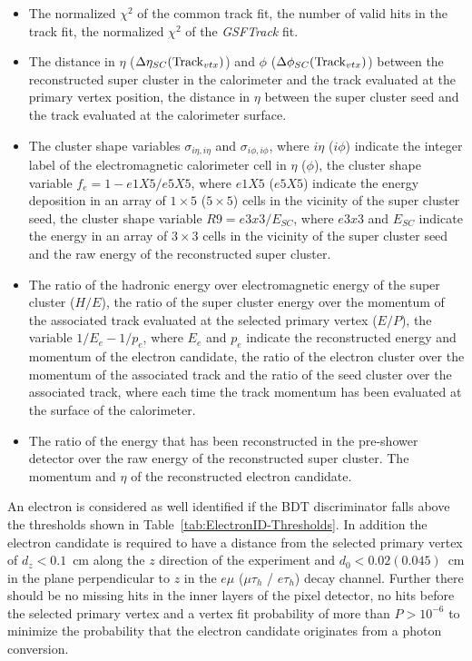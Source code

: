 \begin{itemize}
\item
The normalized $\chi^{2}$ of the common track fit, the number of valid hits in the track fit, the normalized
$\chi^{2}$ of the {\it GSFTrack} fit.
\item
The distance in $\eta$ ($\Delta\eta_{SC}({\rm Track}_{vtx})$) and $\phi$ ($\Delta\phi_{SC}({\rm Track}_{vtx})$)
between the reconstructed super cluster in the calorimeter and the track evaluated at the primary vertex
position, the distance in $\eta$ between the super cluster seed and the track evaluated at the calorimeter
surface.
\item
The cluster shape variables $\sigma_{i\eta,i\eta}$ and $\sigma_{i\phi, i\phi}$, where $i\eta$ ($i\phi$)
indicate the integer label of the electromagnetic calorimeter cell in $\eta$ ($\phi$), the cluster shape
variable $f_{e}=1-e1X5/e5X5$, where $e1X5$ ($e5X5$) indicate the energy deposition in an array of $1 \times 5$
($5 \times 5$) cells in the vicinity of the super cluster seed, the cluster shape variable $R9 = e3x3/E_{SC}$,
where $e3x3$ and $E_{SC}$ indicate the energy in an array of $3 \times 3$ cells in the vicinity of the
super cluster seed and the raw energy of the reconstructed super cluster.
\item
The ratio of the hadronic energy over electromagnetic energy of the super cluster ($H/E$), the ratio of
the super cluster energy over the momentum of the associated track evaluated at the selected primary vertex
($E/P$), the variable $1/E_{e}-1/p_{e}$, where $E_{e}$ and $p_{e}$ indicate the reconstructed energy and
momentum of the electron candidate, the ratio of the electron cluster over the momentum of the associated
track and the ratio of the seed cluster over the associated track, where each time the track momentum
has been evaluated at the surface of the calorimeter.
\item
The ratio of the energy that has been reconstructed in the pre-shower detector over the raw energy of
the reconstructed super cluster. The momentum and $\eta$ of the reconstructed electron candidate.
\end{itemize}

An electron is considered as well identified if the BDT discriminator falls above the thresholds shown
in Table~\ref{tab:ElectronID-Thresholds}\@. In addition the electron candidate is required to have a
distance from the selected primary vertex of $d_{z}<0.1$~cm along the $z$ direction of the experiment
 and $d_{0}<0.02 (0.045)$~cm in the plane perpendicular to $z$ in the $e\mu$ ($\mu\tau_{h}$ / $e\tau_{h}$)
decay channel. Further there should be no missing hits in the inner layers of the pixel detector, no
hits before the selected primary vertex and a vertex fit probability of more than $P>10^{-6}$ to minimize the probability that the electron candidate originates from a photon conversion.

